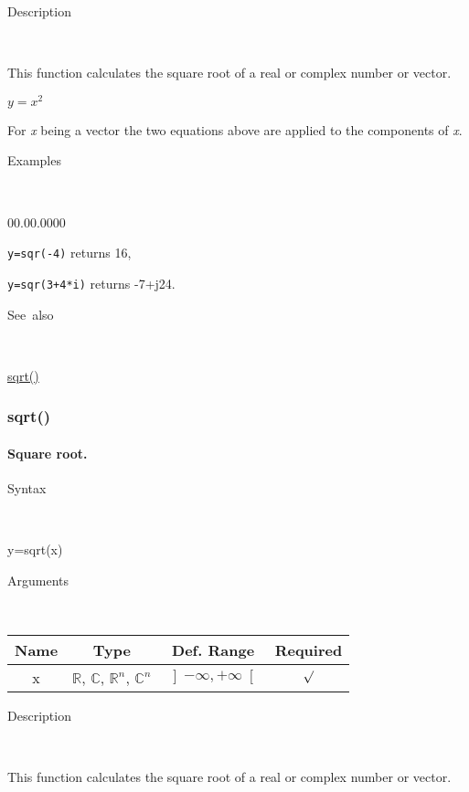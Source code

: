 \begin{description}
\item [Description]~
\end{description}
This function calculates the square root of a real or complex number
or vector.

\medskip{}
$y=x^{2}$ 
\medskip{}

\noindent For \textit{x} being a vector the two equations above are
applied to the components of \textit{x}.

\begin{description}
\item [Examples]~
\end{description}
\begin{lyxlist}{00.00.0000}
\item [\texttt{y=sqr(-4)}]returns 16,
\item [\texttt{y=sqr(3+4{*}i)}]returns -7+j24.
\end{lyxlist}
\begin{description}
\item [See~also]~
\end{description}
\textcolor{blue}{\hyperlink{sqrt}{sqrt()}}


\newpage
\subsubsection*{\hypertarget{sqrt}{}{\Large sqrt()}}


\paragraph{\label{par:Square-root}Square root.}

\begin{description}
\item [Syntax]~
\end{description}
y=sqrt(x)

\begin{description}
\item [Arguments]~
\end{description}
\begin{tabular}{|c|c|c|c|}
\hline 
Name&
Type&
Def. Range&
Required\tabularnewline
\hline
\hline 
x&
$\mathbb{R}$, $\mathbb{C}$, $\mathbb{R}^{n}$, $\mathbb{C}^{n}$&
$\left]-\infty,+\infty\right[$&
$\surd$\tabularnewline
\hline
\end{tabular}

\begin{description}
\item [Description]~
\end{description}
This function calculates the square root of a real or complex number
or vector.

